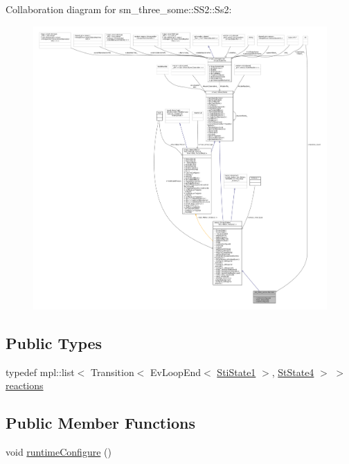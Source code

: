 Collaboration diagram for sm\+\_\+three\+\_\+some\+:\+:S\+S2\+:\+:Ss2\+:
\nopagebreak
\begin{figure}[H]
\begin{center}
\leavevmode
\includegraphics[width=350pt]{structsm__three__some_1_1SS2_1_1Ss2__coll__graph}
\end{center}
\end{figure}
\subsection*{Public Types}
\begin{DoxyCompactItemize}
\item 
typedef mpl\+::list$<$ Transition$<$ Ev\+Loop\+End$<$ \hyperlink{structsm__three__some_1_1inner__states_1_1StiState1}{Sti\+State1} $>$, \hyperlink{structsm__three__some_1_1StState4}{St\+State4} $>$ $>$ \hyperlink{structsm__three__some_1_1SS2_1_1Ss2_a7b8b6caf125da7746c3158cee533442b}{reactions}
\end{DoxyCompactItemize}
\subsection*{Public Member Functions}
\begin{DoxyCompactItemize}
\item 
void \hyperlink{structsm__three__some_1_1SS2_1_1Ss2_a4ab064fed57e881243a86114de3e2144}{runtime\+Configure} ()
\end{DoxyCompactItemize}
